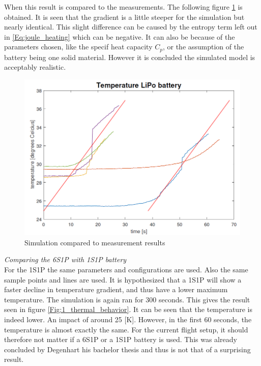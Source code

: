 When this result is compared to the measurements. The following figure \ref{Fig:Simulation_Measurement_Comparison} is obtained. It is seen that the gradient is a little steeper for the simulation but nearly identical. This slight difference can be caused by the entropy term left out in \ref{Eq:joule_heating} which can be negative. It can also be because of the parameters chosen, like the specif heat capacity $C_p$, or the assumption of the battery being one solid material. However it is concluded the simulated model is acceptably realistic. 

\begin{figure} [H]
	\centering
	\includegraphics[width=0.5\linewidth]{Figures/Temperature_Battery_Comparison.png}
	\caption{Simulation compared to measurement results}
   \label{Fig:Simulation_Measurement_Comparison}
\end{figure}

\textit{Comparing the 6S1P with 1S1P battery}\\
For the 1S1P the same parameters and configurations are used. Also the same sample points and lines are used. It is hypothesized that a 1S1P will show a faster decline in temperature gradient, and thus have a lower maximum temperature. The simulation is again ran for 300 seconds. This gives the result seen in figure \ref{Fig:1_thermal_behavior}. It can be seen that the temperature is indeed lower. An impact of around 25 [K]. However, in the first 60 seconds, the temperature is almost exactly the same. For the current flight setup, it should therefore not matter if a 6S1P or a 1S1P battery is used. This was already concluded by Degenhart his bachelor thesis and thus is not that of a surprising result.

